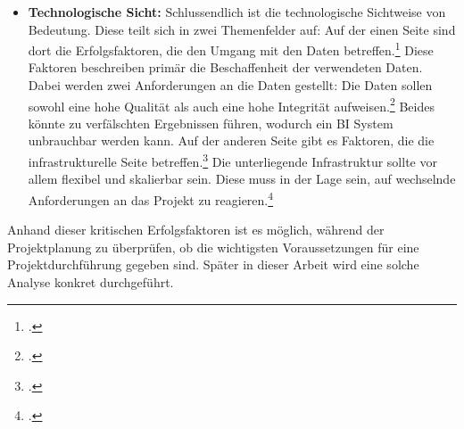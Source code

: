 \begin{itemize}
    reagieren sollen. Nur durch diese Flexibilität ist es möglich schnell zu reagieren, falls etwas geändert, verbessert
    oder aktualisiert werden soll. Eine Methodik, um dies zu erreichen, ist
    Scrum.\footcite[Cf.][p. 164]{isik2011business}\footcite[Cf.][p. 3817]{knabke2013understanding}
    \item \textbf{Technologische Sicht: }Schlussendlich ist die technologische Sichtweise von Bedeutung. Diese teilt sich in zwei
    Themenfelder auf: Auf der einen Seite sind dort die Erfolgsfaktoren, die den Umgang mit den Daten
    betreffen.\footcite[Cf.][Fig. 1]{yeoh2010critical} Diese Faktoren beschreiben primär die Beschaffenheit der verwendeten
    Daten. Dabei werden zwei Anforderungen an die Daten gestellt: Die Daten sollen sowohl eine hohe Qualität als auch eine
    hohe Integrität aufweisen.\footcite[Cf.][p. 163]{isik2011business} Beides könnte zu verfälschten Ergebnissen führen,
    wodurch ein BI System unbrauchbar werden kann. Auf der anderen Seite gibt es Faktoren, die die infrastrukturelle Seite
    betreffen.\footcite[Cf.][Fig. 1]{yeoh2010critical} Die unterliegende Infrastruktur sollte vor allem flexibel und
    skalierbar sein. Diese muss in der Lage sein, auf wechselnde Anforderungen an das Projekt zu
    reagieren.\footcite[Cf.][p. 89f]{yeoh2008managing}
\end{itemize}

Anhand dieser kritischen Erfolgsfaktoren ist es möglich, während der Projektplanung zu überprüfen, ob die wichtigsten
Voraussetzungen für eine Projektdurchführung gegeben sind. Später in dieser Arbeit wird eine solche Analyse konkret durchgeführt.
